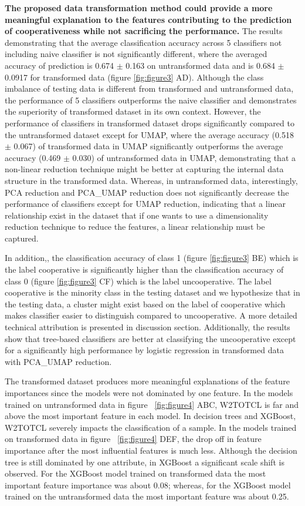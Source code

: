 \textbf{The proposed data transformation method could provide a more meaningful explanation to the features contributing to the prediction of cooperativeness while not sacrificing the performance.} The results demonstrating that the average classification accuracy across 5 classifiers not including naive classifier is not significantly different, where the averaged accuracy of prediction is 0.674 $\pm$ 0.163 on untransformed data and is 0.684 $\pm$ 0.0917 for transformed data (figure \ref{fig:figure3} AD). Although the class imbalance of testing data is different from transformed and untransformed data, the performance of 5 classifiers outperforms the naive classifier and demonstrates the superiority of transformed dataset in its own context. However, the performance of classifiers in transformed dataset drops significantly compared to the untransformed dataset except for UMAP, where the average accuracy (0.518 $\pm$ 0.067) of transformed data in UMAP significantly outperforms the average accuracy (0.469 $\pm$ 0.030) of untransformed data in UMAP, demonstrating that a non-linear reduction technique might be better at capturing the internal data structure in the transformed data. Whereas, in untransformed data, interestingly, PCA reduction and PCA\_UMAP reduction does not significantly decrease the performance of classifiers except for UMAP reduction, indicating that a linear relationship exist in the dataset that if one wants to use a dimensionality reduction technique to reduce the features, a linear relationship must be captured.

In addition,, the classification accuracy of class 1 (figure \ref{fig:figure3} BE) which is the label cooperative is significantly higher than the classification accuracy of class 0 (figure \ref{fig:figure3} CF) which is the label uncooperative. The label cooperative is the minority class in the testing dataset and we hypothesize that in the testing data, a cluster might exist based on the label of cooperative which makes classifier easier to distinguish compared to uncooperative. A more detailed technical attribution is presented in discussion section. Additionally, the results show that tree-based classifiers are better at classifying the uncooperative except for a significantly high performance by logistic regression in transformed data with PCA\_UMAP reduction.

The transformed dataset produces more meaningful explanations of the feature importances since the models were not dominated by one feature. In the models trained on untransformed data in figure ~\ref{fig:figure4} ABC, W2TOTCL is far and above the most important feature in each model. In decision trees and XGBoost, W2TOTCL severely impacts the classification of a sample. In the models trained on transformed data in figure ~\ref{fig:figure4} DEF, the drop off in feature importance after the most influential features is much less. Although the decision tree is still dominated by one attribute, in XGBoost a significant scale shift is observed. For the XGBoost model trained on transformed data the most important feature importance was about 0.08; whereas, for the XGBoost model trained on the untransformed data the most important feature was about 0.25.

